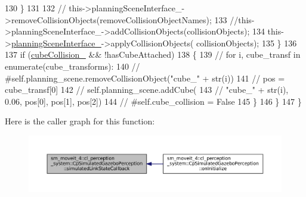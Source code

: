 \begin{DoxyCode}
130                         \}
131 
132                         \textcolor{comment}{//
      this->planningSceneInterface\_->removeCollisionObjects(removeCollisionObjectNames);}
133                         \textcolor{comment}{//this->planningSceneInterface\_->addCollisionObjects(collisionObjects);}
134                         this->\hyperlink{classsm__moveit__4_1_1cl__perception__system_1_1CpSimulatedGazeboPerception_a34bbc7a8b23a1b1c2d3d4d30bd2fe767}{planningSceneInterface\_}->applyCollisionObjects(
      collisionObjects);
135                     \}
136 
137                     \textcolor{keywordflow}{if} (\hyperlink{classsm__moveit__4_1_1cl__perception__system_1_1CpSimulatedGazeboPerception_a5f043c05aa335a438459a55b51e6ace6}{cubeCollision\_} && !hasCubeAttached)
138                     \{
139                         \textcolor{comment}{//         for i, cube\_transf in enumerate(cube\_transforms):}
140                         \textcolor{comment}{//             #self.planning\_scene.removeCollisionObject("cube\_" + str(i))}
141                         \textcolor{comment}{//             pos = cube\_transf[0]}
142                         \textcolor{comment}{//             self.planning\_scene.addCube(}
143                         \textcolor{comment}{//                 "cube\_" + str(i), 0.06, pos[0],  pos[1],  pos[2])}
144                         \textcolor{comment}{//             #self.cube\_collision = False}
145                     \}
146                 \}
147             \}
\end{DoxyCode}
Here is the caller graph for this function\+:
\nopagebreak
\begin{figure}[H]
\begin{center}
\leavevmode
\includegraphics[width=350pt]{classsm__moveit__4_1_1cl__perception__system_1_1CpSimulatedGazeboPerception_a7914ffd20518c866a8a1e11254589d12_icgraph}
\end{center}
\end{figure}
\mbox{\label{classsm__moveit__4_1_1cl__perception__system_1_1CpSimulatedGazeboPerception_a7f5d68f2ff7dd0ade9756058e790efa1}} 
